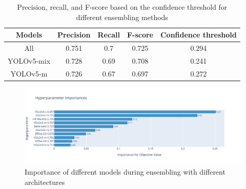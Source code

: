 \begin{table}[h]
    \begin{tabular}{|c|c|c|c|c|}
        \hline
        Models     & Precision & Recall & F-score & Confidence threshold \\ \hline
        All        & 0.751     & 0.7    & 0.725   & 0.294                \\ \hline
        YOLOv5-mix & 0.728     & 0.69   & 0.708   & 0.241                \\ \hline
        YOLOv5-m   & 0.726     & 0.67   & 0.697   & 0.272                \\ \hline
    \end{tabular}
    \caption{Precision, recall, and F-score based on the confidence threshold for different ensembling methods}
    \label{tab:ensembling_prf:ensemble compare}
\end{table}

\begin{figure}
    \centering
    \includegraphics[width=\linewidth]{images/ensemble_all_importance.pdf}
    \caption{Importance of different models during ensembling with different architectures}
    \label{fig:ensembling_parameters_importance}
\end{figure}


